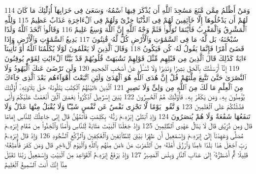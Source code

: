 {\tiny\colorbox{cl_aya}{114}} وَمَنْ أَظْلَمُ مِمَّن مَّنَعَ مَسَٰجِدَ ٱللَّهِ أَن يُذْكَرَ فِيهَا ٱسْمُهُۥ وَسَعَىٰ فِى خَرَابِهَآ أُو۟لَٰٓئِكَ مَا كَانَ لَهُمْ أَن يَدْخُلُوهَآ إِلَّا خَآئِفِينَ لَهُمْ فِى ٱلدُّنْيَا خِزْىٌ وَلَهُمْ فِى ٱلْءَاخِرَةِ عَذَابٌ عَظِيمٌ
{\tiny\colorbox{cl_aya}{115}} وَلِلَّهِ ٱلْمَشْرِقُ وَٱلْمَغْرِبُ فَأَيْنَمَا تُوَلُّوا۟ فَثَمَّ وَجْهُ ٱللَّهِ إِنَّ ٱللَّهَ وَٰسِعٌ عَلِيمٌ
{\tiny\colorbox{cl_aya}{116}} وَقَالُوا۟ ٱتَّخَذَ ٱللَّهُ وَلَدًا سُبْحَٰنَهُۥ بَل لَّهُۥ مَا فِى ٱلسَّمَٰوَٰتِ وَٱلْأَرْضِ كُلٌّ لَّهُۥ قَٰنِتُونَ
{\tiny\colorbox{cl_aya}{117}} بَدِيعُ ٱلسَّمَٰوَٰتِ وَٱلْأَرْضِ وَإِذَا قَضَىٰٓ أَمْرًا فَإِنَّمَا يَقُولُ لَهُۥ كُن فَيَكُونُ
{\tiny\colorbox{cl_aya}{118}} وَقَالَ ٱلَّذِينَ لَا يَعْلَمُونَ لَوْلَا يُكَلِّمُنَا ٱللَّهُ أَوْ تَأْتِينَآ ءَايَةٌ كَذَٰلِكَ قَالَ ٱلَّذِينَ مِن قَبْلِهِم مِّثْلَ قَوْلِهِمْ تَشَٰبَهَتْ قُلُوبُهُمْ قَدْ بَيَّنَّا ٱلْءَايَٰتِ لِقَوْمٍ يُوقِنُونَ
{\tiny\colorbox{cl_aya}{119}} إِنَّآ أَرْسَلْنَٰكَ بِٱلْحَقِّ بَشِيرًا وَنَذِيرًا وَلَا تُسْـَٔلُ عَنْ أَصْحَٰبِ ٱلْجَحِيمِ
{\tiny\colorbox{cl_aya}{120}} وَلَن تَرْضَىٰ عَنكَ ٱلْيَهُودُ وَلَا ٱلنَّصَٰرَىٰ حَتَّىٰ تَتَّبِعَ مِلَّتَهُمْ قُلْ إِنَّ هُدَى ٱللَّهِ هُوَ ٱلْهُدَىٰ وَلَئِنِ ٱتَّبَعْتَ أَهْوَآءَهُم بَعْدَ ٱلَّذِى جَآءَكَ مِنَ ٱلْعِلْمِ مَا لَكَ مِنَ ٱللَّهِ مِن وَلِىٍّ وَلَا نَصِيرٍ
{\tiny\colorbox{cl_aya}{121}} ٱلَّذِينَ ءَاتَيْنَٰهُمُ ٱلْكِتَٰبَ يَتْلُونَهُۥ حَقَّ تِلَاوَتِهِۦٓ أُو۟لَٰٓئِكَ يُؤْمِنُونَ بِهِۦ وَمَن يَكْفُرْ بِهِۦ فَأُو۟لَٰٓئِكَ هُمُ ٱلْخَٰسِرُونَ
{\tiny\colorbox{cl_aya}{122}} يَٰبَنِىٓ إِسْرَٰٓءِيلَ ٱذْكُرُوا۟ نِعْمَتِىَ ٱلَّتِىٓ أَنْعَمْتُ عَلَيْكُمْ وَأَنِّى فَضَّلْتُكُمْ عَلَى ٱلْعَٰلَمِينَ
{\tiny\colorbox{cl_aya}{123}} وَٱتَّقُوا۟ يَوْمًا لَّا تَجْزِى نَفْسٌ عَن نَّفْسٍ شَيْـًٔا وَلَا يُقْبَلُ مِنْهَا عَدْلٌ وَلَا تَنفَعُهَا شَفَٰعَةٌ وَلَا هُمْ يُنصَرُونَ
{\tiny\colorbox{cl_aya}{124}} وَإِذِ ٱبْتَلَىٰٓ إِبْرَٰهِۦمَ رَبُّهُۥ بِكَلِمَٰتٍ فَأَتَمَّهُنَّ قَالَ إِنِّى جَاعِلُكَ لِلنَّاسِ إِمَامًا قَالَ وَمِن ذُرِّيَّتِى قَالَ لَا يَنَالُ عَهْدِى ٱلظَّٰلِمِينَ
{\tiny\colorbox{cl_aya}{125}} وَإِذْ جَعَلْنَا ٱلْبَيْتَ مَثَابَةً لِّلنَّاسِ وَأَمْنًا وَٱتَّخِذُوا۟ مِن مَّقَامِ إِبْرَٰهِۦمَ مُصَلًّى وَعَهِدْنَآ إِلَىٰٓ إِبْرَٰهِۦمَ وَإِسْمَٰعِيلَ أَن طَهِّرَا بَيْتِىَ لِلطَّآئِفِينَ وَٱلْعَٰكِفِينَ وَٱلرُّكَّعِ ٱلسُّجُودِ
{\tiny\colorbox{cl_aya}{126}} وَإِذْ قَالَ إِبْرَٰهِۦمُ رَبِّ ٱجْعَلْ هَٰذَا بَلَدًا ءَامِنًا وَٱرْزُقْ أَهْلَهُۥ مِنَ ٱلثَّمَرَٰتِ مَنْ ءَامَنَ مِنْهُم بِٱللَّهِ وَٱلْيَوْمِ ٱلْءَاخِرِ قَالَ وَمَن كَفَرَ فَأُمَتِّعُهُۥ قَلِيلًا ثُمَّ أَضْطَرُّهُۥٓ إِلَىٰ عَذَابِ ٱلنَّارِ وَبِئْسَ ٱلْمَصِيرُ
{\tiny\colorbox{cl_aya}{127}} وَإِذْ يَرْفَعُ إِبْرَٰهِۦمُ ٱلْقَوَاعِدَ مِنَ ٱلْبَيْتِ وَإِسْمَٰعِيلُ رَبَّنَا تَقَبَّلْ مِنَّآ إِنَّكَ أَنتَ ٱلسَّمِيعُ ٱلْعَلِيمُ
